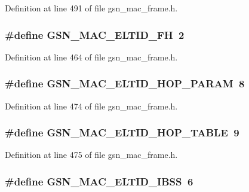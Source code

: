 Definition at line 491 of file gsn\_\-mac\_\-frame.h.

\hypertarget{a00523_a7ade8f55825d871d501cf080f43506eb}{
\subsubsection[{GSN\_\-MAC\_\-ELTID\_\-FH}]{\setlength{\rightskip}{0pt plus 5cm}\#define GSN\_\-MAC\_\-ELTID\_\-FH~2}}
\label{a00523_a7ade8f55825d871d501cf080f43506eb}


Definition at line 464 of file gsn\_\-mac\_\-frame.h.

\hypertarget{a00523_a857dd8bbe9e2b50f549796d8716e48ea}{
\subsubsection[{GSN\_\-MAC\_\-ELTID\_\-HOP\_\-PARAM}]{\setlength{\rightskip}{0pt plus 5cm}\#define GSN\_\-MAC\_\-ELTID\_\-HOP\_\-PARAM~8}}
\label{a00523_a857dd8bbe9e2b50f549796d8716e48ea}


Definition at line 474 of file gsn\_\-mac\_\-frame.h.

\hypertarget{a00523_a9c46ccc77c25ce912c7afed2039cc07a}{
\subsubsection[{GSN\_\-MAC\_\-ELTID\_\-HOP\_\-TABLE}]{\setlength{\rightskip}{0pt plus 5cm}\#define GSN\_\-MAC\_\-ELTID\_\-HOP\_\-TABLE~9}}
\label{a00523_a9c46ccc77c25ce912c7afed2039cc07a}


Definition at line 475 of file gsn\_\-mac\_\-frame.h.

\hypertarget{a00523_a7cb8a958d39ce3ce9b01b9183ddc7955}{
\subsubsection[{GSN\_\-MAC\_\-ELTID\_\-IBSS}]{\setlength{\rightskip}{0pt plus 5cm}\#define GSN\_\-MAC\_\-ELTID\_\-IBSS~6}}
\label{a00523_a7cb8a958d39ce3ce9b01b9183ddc7955}


